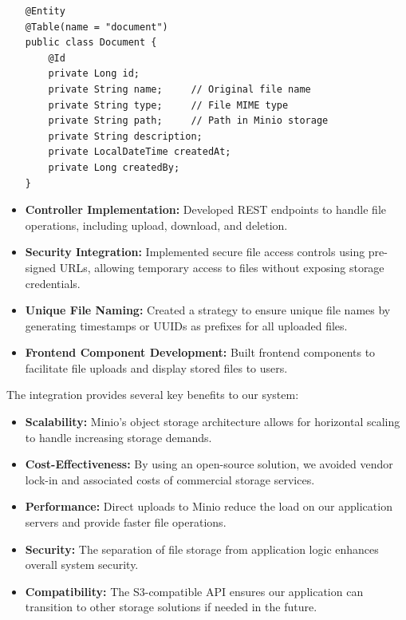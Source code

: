 \begin{itemize}
    \begin{verbatim}
@Entity
@Table(name = "document")
public class Document {
    @Id
    private Long id;
    private String name;     // Original file name
    private String type;     // File MIME type
    private String path;     // Path in Minio storage
    private String description;
    private LocalDateTime createdAt;
    private Long createdBy;
}
    \end{verbatim}
    
    \item \textbf{Controller Implementation:} Developed REST endpoints to handle file operations, including upload, download, and deletion.
    
    \item \textbf{Security Integration:} Implemented secure file access controls using pre-signed URLs, allowing temporary access to files without exposing storage credentials.
    
    \item \textbf{Unique File Naming:} Created a strategy to ensure unique file names by generating timestamps or UUIDs as prefixes for all uploaded files.
    
    \item \textbf{Frontend Component Development:} Built frontend components to facilitate file uploads and display stored files to users.
\end{itemize}

The integration provides several key benefits to our system:

\begin{itemize}
    \item \textbf{Scalability:} Minio's object storage architecture allows for horizontal scaling to handle increasing storage demands.
    
    \item \textbf{Cost-Effectiveness:} By using an open-source solution, we avoided vendor lock-in and associated costs of commercial storage services.
    
    \item \textbf{Performance:} Direct uploads to Minio reduce the load on our application servers and provide faster file operations.
    
    \item \textbf{Security:} The separation of file storage from application logic enhances overall system security.
    
    \item \textbf{Compatibility:} The S3-compatible API ensures our application can transition to other storage solutions if needed in the future.
\end{itemize}